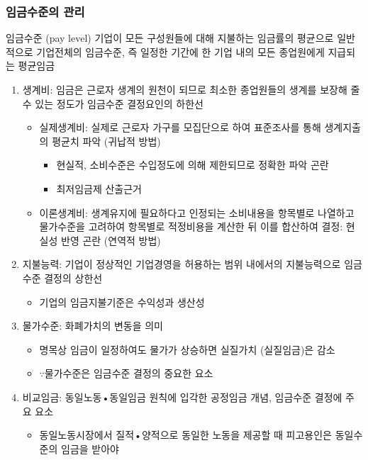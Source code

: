 \documentclass[aspectratio=169,xcolor=dvipsnames,handout]{beamer}
\begin{document}
\begin{frame}[allowframebreaks]
    \frametitle{임금수준의 관리}
    \begin{block}{임금수준 (pay level)}
        기업이 모든 구성원들에 대해 지불하는 임금률의 평균으로 일반적으로 기업전체의 임금수준, 즉 일정한 기간에 한 기업 내의 모든 종업원에게 지급되는 평균임금
    \end{block}
    \begin{enumerate}[<+->]
        \item 생계비: 임금은 근로자 생계의 원천이 되므로 최소한 종업원들의 생계를 보장해 줄 수 있는 정도가 임금수준 결정요인의 하한선
        \begin{itemize}[<+->]
            \item 실제생계비: 실제로 근로자 가구를 모집단으로 하여 표준조사를 통해 생계지출의 평균치 파악 (귀납적 방법)
            \begin{itemize}[<+->]
                \item 현실적, 소비수준은 수입정도에 의해 제한되므로 정확한 파악 곤란 
                \item 최저임금제 산출근거
            \end{itemize}
            \item 이론생계비: 생계유지에 필요하다고 인정되는 소비내용을 항목별로 나열하고 물가수준을 고려하여 항목별로 적정비용을 계산한 뒤 이를 합산하여 결정: 현실성 반영 곤란 (연역적 방법)
        \end{itemize}
        \item 지불능력: 기업이 정상적인 기업경영을 허용하는 범위 내에서의 지불능력으로 임금수준 결정의 상한선
        \begin{itemize}[<+->]
            \item 기업의 임금지불기준은 수익성과 생산성
        \end{itemize}
        \item 물가수준: 화폐가치의 변동을 의미
        \begin{itemize}[<+->]
            \item 명목상 임금이 일정하여도 물가가 상승하면 실질가치 (실질임금)은 감소
            \item $\because$물가수준은 임금수준 결정의 중요한 요소
        \end{itemize}
        \item 비교임금: 동일노동•동일임금 원칙에 입각한 공정임금 개념, 임금수준 결정에 주요 요소
            \begin{itemize}[<+->]
            \item 동일노동시장에서 질적•양적으로 동일한 노동을 제공할 때 피고용인은 동일수준의 임금을 받아야

\end{itemize}
\end{enumerate}
\end{frame}
\end{document}
